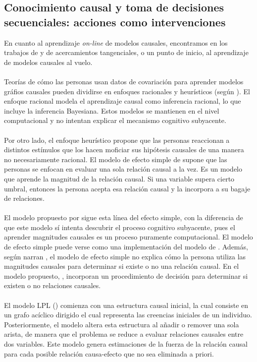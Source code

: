 \documentclass[11pt]{article}
\theoremstyle{plain}
\begin{document}
\subsection{Conocimiento causal y toma de decisiones secuenciales: acciones como intervenciones}
En cuanto al aprendizaje \textit{on-line} de modelos causales, encontramos en los trabajos de \cite{wellen2012learning} y de \cite{kummerfeld2013tracking} acercamientos tangenciales, o un punto de inicio, al aprendizaje de modelos causales al vuelo.\\
\\
Teorías de cómo las personas usan datos de covariación para aprender modelos gráfios causales pueden dividirse en enfoques racionales y heurísticos (según  \cite{wellen2012learning}). El enfoque racional modela el aprendizaje causal como inferencia racional, lo que incluye la inferencia Bayesiana. Estos modelos se mantienen en el nivel computacional y no intentan explicar el mecanismo cognitivo subyacente.\\
\\
Por otro lado, el enfoque heurístico propone que las personas reaccionan a distintos estímulos que los hacen moficiar sus hipótesis causales de una manera no necesariamente racional. El modelo de efecto simple de \cite{waldmann2008causal} supone que las personas se enfocan en evaluar una sola relación causal a la vez. Es un modelo que aprende la magnitud de la relación causal. Si una variable supera cierto umbral, entonces la persona acepta esa relación causal y la incorpora a su bagaje de relaciones.\\
\\
El modelo propuesto por \cite{wellen2012learning} sigue esta línea del efecto simple, con la diferencia de que este modelo sí intenta descubrir el proceso cognitivo subyacente, pues el aprender magnitudes causales es un proceso puramente computacional. El modelo de efecto simple puede verse como una implementación del modelo de \cite{danks2003dynamical}. Además, según narran \cite{wellen2012learning}, el modelo de efecto simple no explica cómo la persona utiliza las magnitudes causales para determinar si existe o no una relación causal. En el modelo propuesto, \cite{wellen2012learning}, incorporan un procedimiento de decisión para determinar si existen o no relaciones causales.\\
\\
El modelo LPL (\cite{wellen2012learning}) comienza con una estructura causal inicial, la cual consiste en un grafo acíclico dirigido el cual representa las creencias iniciales de un individuo. Posteriormente, el modelo altera esta estructura al añadir o remover una sola arista, de manera que el problema se reduce a evaluar relaciones causales entre dos variables. Este modelo genera estimaciones de la fuerza de la relación causal para cada posible relación causa-efecto que no sea eliminada a priori.\\
\end{document}
